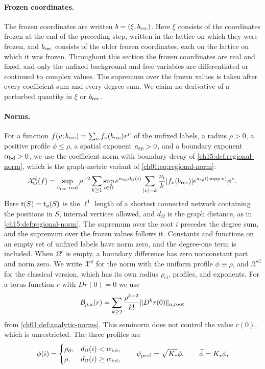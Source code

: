 \paragraph{Frozen coordinates.}
The frozen coordinates are written $b=(\xi,b_{\mathrm{rec}})$. Here $\xi$ consists of the coordinates frozen at the end of the preceding step, written in the lattice on which they were frozen, and $b_{\mathrm{rec}}$ consists of the older frozen coordinates, each on the lattice on which it was frozen. Throughout this section the frozen coordinates are real and fixed, and only the unfixed background and free variables are differentiated or continued to complex values. The supremum over the frozen values is taken after every coefficient sum and every degree sum. We claim no derivative of a perturbed quantity in $\xi$ or $b_{\mathrm{rec}}$.

\paragraph{Norms.}
For a function $f(v;b_{\mathrm{rec}})=\sum_\nu f_\nu(b_{\mathrm{rec}})v^\nu$ of the unfixed labels, a radius $\rho>0$, a positive profile $\phi\le\rho$, a spatial exponent $a_{\mathrm{sp}}>0$, and a boundary exponent $\alpha_{\mathrm{bd}}>0$, we use the coefficient norm with boundary decay of \cref{ch15:def:regional-norm}, which is the graph-metric variant of \eqref{ch01:eq:regional-norm}:
\[
 \mathcal X_\Omega^\phi(f)=\sup_{\Rec\ \mathrm{real}}\rho^{-2}
 \sum_{k\ge1}\sup_{i\in\Omega}e^{\awall d_\Omega(i)}
 \sum_{\abs\nu=k}\frac{\nu_i}{k}\abs{f_\nu(\Rec)}e^{\asp\Tree(\supp\nu)}\phi^\nu .
\]
Here $\mathsf t(S)=\mathsf t_g(S)$ is the $\ell^1$ length of a shortest connected network containing the positions in $S$, internal vertices allowed, and $d_\Omega$ is the graph distance, as in \cref{ch15:def:regional-norm}. The supremum over the root $i$ precedes the degree sum, and the supremum over the frozen values follows it. Constants and functions on an empty set of unfixed labels have norm zero, and the degree-one term is included. When $\Omega^c$ is empty, a boundary difference has zero nonconstant part and norm zero. We write $\mathcal X^\rho$ for the norm with the uniform profile $\phi\equiv\rho$, and $\mathcal X^{\mathrm{cl}}$ for the classical version, which has its own radius $\rho_{\mathrm{cl}}$, profiles, and exponents. For a torus function $r$ with $Dr(0)=0$ we use
\[
 \mathcal B_{\rho,a}(r)=\sum_{k\ge2}\frac{\rho^{k-2}}{k!}\lVert D^kr(0)\rVert_{a,\mathrm{root}}
\]
from \cref{ch01:def:analytic-norms}. This seminorm does not control the value $r(0)$, which is unrestricted. The three profiles are
\[
 \phi(i)=\begin{cases}\rho_\partial,&d_\Omega(i)<w_{\mathrm{bd}},\\ \rho,&d_\Omega(i)\ge w_{\mathrm{bd}},\end{cases}
 \qquad \psi_{\mathrm{prof}}=\sqrt{K_*}\phi,\qquad \widehat\phi=K_*\phi,
\]
